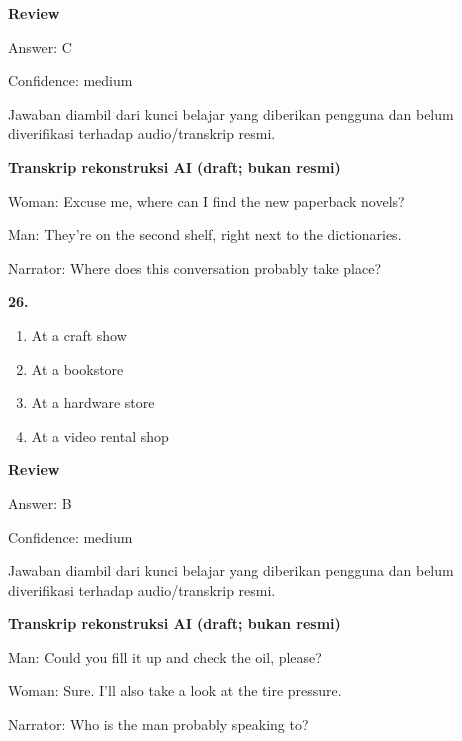 \documentclass[12pt]{article}
\begin{document}
\par
\begingroup
\setlength{\parskip}{0pt}
\setlength{\parindent}{0pt}
\textbf{Review}\par
Answer: C\par
Confidence: medium\par
Jawaban diambil dari kunci belajar yang diberikan pengguna dan belum diverifikasi terhadap audio/transkrip resmi.\par
\endgroup
\par
\vspace{0.25\baselineskip}
\begin{exampleblock}
\textbf{Transkrip rekonstruksi AI (draft; bukan resmi)}\par
Woman: Excuse me, where can I find the new paperback novels?\par
Man: They're on the second shelf, right next to the dictionaries.\par
Narrator: Where does this conversation probably take place?\par
\end{exampleblock}
\noindent\textbf{26.}
\begin{enumerate}[label=(\Alph*),leftmargin=*,itemsep=0.2em]
\item At a craft show
\item At a bookstore
\item At a hardware store
\item At a video rental shop
\end{enumerate}
\par
\begingroup
\setlength{\parskip}{0pt}
\setlength{\parindent}{0pt}
\textbf{Review}\par
Answer: B\par
Confidence: medium\par
Jawaban diambil dari kunci belajar yang diberikan pengguna dan belum diverifikasi terhadap audio/transkrip resmi.\par
\endgroup
\par
\vspace{0.25\baselineskip}
\begin{exampleblock}
\textbf{Transkrip rekonstruksi AI (draft; bukan resmi)}\par
Man: Could you fill it up and check the oil, please?\par
Woman: Sure. I'll also take a look at the tire pressure.\par
Narrator: Who is the man probably speaking to?\par
\end{exampleblock}
\end{document}
